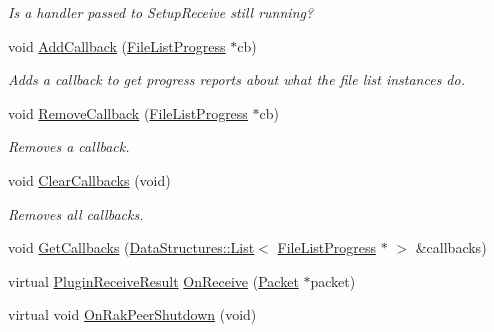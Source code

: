 \begin{DoxyCompactItemize}
\begin{DoxyCompactList}\small\item\em Is a handler passed to Setup\-Receive still running? \end{DoxyCompactList}\item 
void \hyperlink{class_rak_net_1_1_file_list_transfer_a0212731880b8561cc62adb6b3d78a4d1}{Add\-Callback} (\hyperlink{class_rak_net_1_1_file_list_progress}{File\-List\-Progress} $\ast$cb)
\begin{DoxyCompactList}\small\item\em Adds a callback to get progress reports about what the file list instances do. \end{DoxyCompactList}\item 
void \hyperlink{class_rak_net_1_1_file_list_transfer_a086b23597cfd50682b1e1cfdd5c4cda8}{Remove\-Callback} (\hyperlink{class_rak_net_1_1_file_list_progress}{File\-List\-Progress} $\ast$cb)
\begin{DoxyCompactList}\small\item\em Removes a callback. \end{DoxyCompactList}\item 
\hypertarget{class_rak_net_1_1_file_list_transfer_ab8f81c5f19c456b1ab65db67e5fa91b9}{void \hyperlink{class_rak_net_1_1_file_list_transfer_ab8f81c5f19c456b1ab65db67e5fa91b9}{Clear\-Callbacks} (void)}\label{class_rak_net_1_1_file_list_transfer_ab8f81c5f19c456b1ab65db67e5fa91b9}

\begin{DoxyCompactList}\small\item\em Removes all callbacks. \end{DoxyCompactList}\item 
void \hyperlink{class_rak_net_1_1_file_list_transfer_abf2a70a13e0507d57be3197107f50a5c}{Get\-Callbacks} (\hyperlink{class_data_structures_1_1_list}{Data\-Structures\-::\-List}$<$ \hyperlink{class_rak_net_1_1_file_list_progress}{File\-List\-Progress} $\ast$ $>$ \&callbacks)
\item 
virtual \hyperlink{group___p_l_u_g_i_n___i_n_t_e_r_f_a_c_e___g_r_o_u_p_ga89998adaafb29e5d879113b992161085}{Plugin\-Receive\-Result} \hyperlink{class_rak_net_1_1_file_list_transfer_afc5dc95534da3a6e812dcc7d045bb9cd}{On\-Receive} (\hyperlink{struct_rak_net_1_1_packet}{Packet} $\ast$packet)
\item 
\hypertarget{class_rak_net_1_1_file_list_transfer_a5f3d8f286e7748fa4c84bd4d4b58df22}{virtual void \hyperlink{class_rak_net_1_1_file_list_transfer_a5f3d8f286e7748fa4c84bd4d4b58df22}{On\-Rak\-Peer\-Shutdown} (void)}\label{class_rak_net_1_1_file_list_transfer_a5f3d8f286e7748fa4c84bd4d4b58df22}


\end{DoxyCompactItemize}
